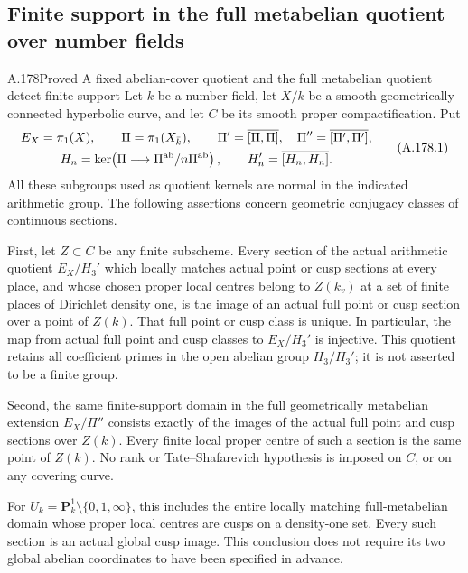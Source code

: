 \subsection{Finite support in the full metabelian quotient over number fields}

\begin{statement}{A.178}{Proved}
{A fixed abelian-cover quotient and the full metabelian quotient detect finite support}
Let \(k\) be a number field, let \(X/k\) be a smooth geometrically
connected hyperbolic curve, and let \(C\) be its smooth proper
compactification.  Put
\[
 \begin{gathered}
 E_X=\pi_1(X),\qquad \Pi=\pi_1(X_{\bar k}),\qquad
 \Pi'=\overline{[\Pi,\Pi]},\quad
 \Pi''=\overline{[\Pi',\Pi']},\\
 H_n=\ker\!\left(\Pi\longrightarrow
                         \Pi^{\rm ab}/n\Pi^{\rm ab}\right),
       \qquad H_n'=\overline{[H_n,H_n]}.
 \end{gathered}
\tag{A.178.1}
\]
All these subgroups used as quotient kernels are normal in the
indicated arithmetic group.  The following assertions concern
geometric conjugacy classes of continuous sections.

First, let \(Z\subset C\) be any finite subscheme.  Every section of
the actual arithmetic quotient \(E_X/H_3'\) which locally matches
actual point or cusp sections at every place, and whose chosen
proper local centres belong to \(Z(k_v)\) at a set of finite places
of Dirichlet density one, is the image of an actual full point or
cusp section over a point of \(Z(k)\).  That full point or cusp
class is unique.  In particular, the map from actual full point
and cusp classes to \(E_X/H_3'\) is injective.  This quotient
retains all coefficient primes in the open abelian group
\(H_3/H_3'\); it is not asserted to be a finite group.

Second, the same finite-support domain in the full geometrically
metabelian extension \(E_X/\Pi''\) consists exactly of the
images of the actual full point and cusp sections over \(Z(k)\).
Every finite local proper centre of such a section is the same
point of \(Z(k)\).  No rank or Tate--Shafarevich hypothesis is
imposed on \(C\), or on any covering curve.

For \(U_k=\mathbf P^1_k\setminus\{0,1,\infty\}\), this includes
the entire locally matching full-metabelian domain whose proper
local centres are cusps on a density-one set.  Every such section
is an actual global cusp image.  This conclusion does not require
its two global abelian coordinates to have been specified in
advance.


\end{statement}
